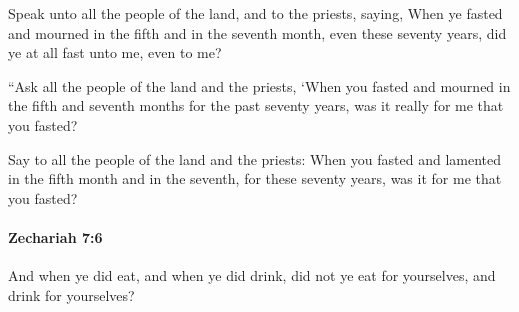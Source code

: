 			\begin{versebox}
					\item[BHS] 
					\item[LXX] 
					\item[ASV] Speak unto all the people of the land, and to the priests, saying, When ye fasted and mourned in the fifth and in the seventh month, even these seventy years, did ye at all fast unto me, even to me?
					\item[NIV] “Ask all the people of the land and the priests, ‘When you fasted and mourned in the fifth and seventh months for the past seventy years, was it really for me that you fasted?
					\item[NRSV] Say to all the people of the land and the priests: When you fasted and lamented in the fifth month and in the seventh, for these seventy years, was it for me that you fasted?
			\end{versebox}

		\paragraph{Zechariah 7:6} %
			\label{ZECHARIAH-7-6}

			And when ye did eat, and when ye did drink, did not ye eat for yourselves, and drink for yourselves?

